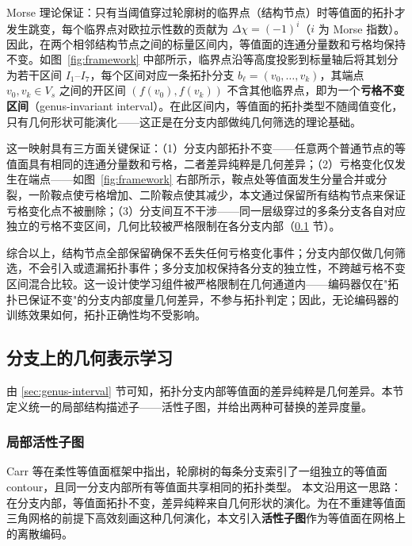 \documentclass[twocolumn, a4paper, 10pt]{article}
\begin{document}
Morse 理论保证：只有当阈值穿过轮廓树的临界点（结构节点）时等值面的拓扑才发生跳变，每个临界点对欧拉示性数的贡献为 $\Delta\chi=(-1)^i$（$i$ 为 Morse 指数）。因此，在两个相邻结构节点之间的标量区间内，等值面的连通分量数和亏格均保持不变。如图~\ref{fig:framework} 中部所示，临界点沿等高度投影到标量轴后将其划分为若干区间 $I_1$--$I_7$，每个区间对应一条拓扑分支 $b_\ell=(v_0,\ldots,v_k)$，其端点 $v_0,v_k\in V_s$ 之间的开区间 $(f(v_0),f(v_k))$ 不含其他临界点，即为一个\textbf{亏格不变区间}（genus-invariant interval）。在此区间内，等值面的拓扑类型不随阈值变化，只有几何形状可能演化——这正是在分支内部做纯几何筛选的理论基础。

这一映射具有三方面关键保证：（1）分支内部拓扑不变——任意两个普通节点的等值面具有相同的连通分量数和亏格，二者差异纯粹是几何差异；（2）亏格变化仅发生在端点——如图~\ref{fig:framework} 右部所示，鞍点处等值面发生分量合并或分裂，一阶鞍点使亏格增加、二阶鞍点使其减少，本文通过保留所有结构节点来保证亏格变化点不被删除；（3）分支间互不干涉——同一层级穿过的多条分支各自对应独立的亏格不变区间，几何比较被严格限制在各分支内部（\ref{sec:geo-repr} 节）。

综合以上，结构节点全部保留确保不丢失任何亏格变化事件；分支内部仅做几何筛选，不会引入或遗漏拓扑事件；多分支加权保持各分支的独立性，不跨越亏格不变区间混合比较。这一设计使学习组件被严格限制在几何通道内——编码器仅在"拓扑已保证不变"的分支内部度量几何差异，不参与拓扑判定；因此，无论编码器的训练效果如何，拓扑正确性均不受影响。

\subsection{分支上的几何表示学习}
\label{sec:geo-repr}

由 \ref{sec:genus-interval} 节可知，拓扑分支内部等值面的差异纯粹是几何差异。本节定义统一的局部结构描述子——活性子图，并给出两种可替换的差异度量。

\subsubsection{局部活性子图}
\label{sec:subgraph}

Carr 等在柔性等值面框架中指出，轮廓树的每条分支索引了一组独立的等值面 contour，且同一分支内部所有等值面共享相同的拓扑类型。\cite{carr_flexible_2010} 本文沿用这一思路：在分支内部，等值面拓扑不变，差异纯粹来自几何形状的演化。为在不重建等值面三角网格的前提下高效刻画这种几何演化，本文引入\textbf{活性子图}作为等值面在网格上的离散编码。
\end{document}
